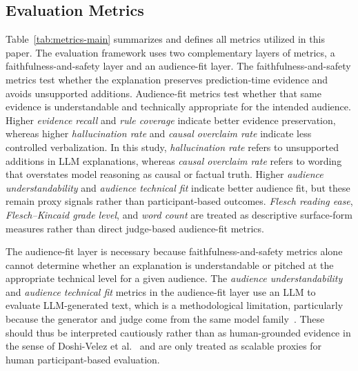\documentclass[sigconf]{acmart}
\begin{document}
\subsection{Evaluation Metrics}
Table~\ref{tab:metrics-main} summarizes and defines all metrics utilized in this paper. The evaluation framework uses two complementary layers of metrics, a faithfulness-and-safety layer and an audience-fit layer. The faithfulness-and-safety metrics test whether the explanation preserves prediction-time evidence and avoids unsupported additions. Audience-fit metrics test whether that same evidence is understandable and technically appropriate for the intended audience. Higher \emph{evidence recall} and \emph{rule coverage} indicate better evidence preservation, whereas higher \emph{hallucination rate} and \emph{causal overclaim rate} indicate less controlled verbalization. In this study, \emph{hallucination rate} refers to unsupported additions in LLM explanations, whereas \emph{causal overclaim rate} refers to wording that overstates model reasoning as causal or factual truth. Higher \emph{audience understandability} and \emph{audience technical fit} indicate better audience fit, but these remain proxy signals rather than participant-based outcomes. \emph{Flesch reading ease}, \emph{Flesch--Kincaid grade level}, and \emph{word count} are treated as descriptive surface-form measures rather than direct judge-based audience-fit metrics. 


The audience-fit layer is necessary because faithfulness-and-safety metrics alone cannot determine whether an explanation is understandable or pitched at the appropriate technical level for a given audience. The \emph{audience understandability} and \emph{audience technical fit} metrics in the audience-fit layer use an LLM to evaluate LLM-generated text, which is a methodological limitation, particularly because the generator and judge come from the same model family~\cite{liu2023geval,huang2025judge}. These should thus be interpreted cautiously rather than as human-grounded evidence in the sense of Doshi-Velez et al.~\cite{doshivelez2017rigorous} and are only treated as scalable proxies for human participant-based evaluation.
\end{document}

